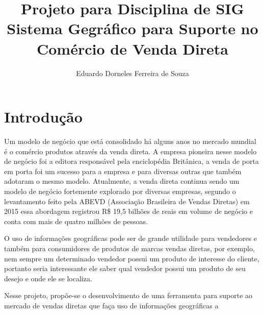 \documentclass[oneside]{article}
\begin{document}
\title{Projeto para Disciplina de SIG \\
        \large Sistema Gegráfico para Suporte no Comércio de Venda Direta}
\author{Eduardo Dorneles Ferreira de Souza}
\maketitle

\pagestyle{plain}

\section{Introdução}
Um modelo de negócio que está consolidado há alguns anos no mercado mundial é o
comércio produtos através da venda direta. A empresa pioneira nesse modelo de
negócio foi a editora responsável pela enciclopédia Britânica, a venda de porta
em porta foi um sucesso para a empresa e para diversas outras que também adotaram
o mesmo modelo. Atualmente, a venda direta continua sendo um modelo de negócio
fortemente explorado por diversas empresas, segundo o levantamento feito pela ABEVD
(Associação Brasileira de Vendas Diretas) em 2015 essa abordagem registrou
R\$ 19,5 bilhões de reais em volume de negócio e conta com mais de quatro milhões
de pessoas.

O uso de informações geográficas pode ser de grande utilidade para vendedores
e também para consumidores de produtos de marcas vendas diretas, por exemplo,
nem sempre um determinado vendedor possui um produto de interesse do cliente,
portanto seria interessante ele saber qual vendedor possui um produto de seu
desejo e onde ele se localiza.

Nesse projeto, propõe-se o desenvolvimento de uma ferramenta para suporte ao
mercado de vendas diretas que faça uso de informações geográficas a
\end{document}
